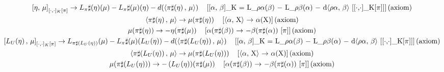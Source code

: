 \documentclass[11pt]{article}
\newcommand{\prompt}[4]{
        {\ttfamily\llap{{\color{#2}[#3]:\hspace{3pt}#4}}\vspace{-\baselineskip}}
    }
\begin{document}
            
\prompt{Out}{outcolor}{3}{}
    
    {\allowdisplaybreaks\scriptsize
\begin{gather*}
\left[\eta,\, \mu\right]_{[\cdot,\cdot]_K[\pi]} \to L_\pi\sharp(\eta)\!\left(\mu\right) - L_\pi\sharp(\mu)\!\left(\eta\right) - d\!\left(\langle \pi\sharp\!\left(\eta\right),\, \mu \rangle\right) \quad \text{[[\ensuremath{\alpha}, \ensuremath{\beta}]\_K = L\_\ensuremath{\rho}\ensuremath{\alpha}(\ensuremath{\beta}) \ensuremath{-} L\_\ensuremath{\rho}\ensuremath{\beta}(\ensuremath{\alpha}) \ensuremath{-} d\ensuremath{\langle}\ensuremath{\rho}\ensuremath{\alpha}, \ensuremath{\beta}\ensuremath{\rangle} [[\ensuremath{\cdot},\ensuremath{\cdot}]\_K[\ensuremath{\pi}]]]\,(axiom)} \\
\langle \pi\sharp\!\left(\eta\right),\, \mu \rangle \to \mu\!\left(\pi\sharp\!\left(\eta\right)\right) \quad \text{[\ensuremath{\langle}\ensuremath{\alpha}, X\ensuremath{\rangle} \ensuremath{\to} \ensuremath{\alpha}(X)]\,(axiom)} \\
\mu\!\left(\pi\sharp\!\left(\eta\right)\right) \to -\eta\!\left(\pi\sharp\!\left(\mu\right)\right) \quad \text{[\ensuremath{\alpha}(\ensuremath{\pi}\ensuremath{\sharp}(\ensuremath{\beta})) \ensuremath{\to} \ensuremath{-}\ensuremath{\beta}(\ensuremath{\pi}\ensuremath{\sharp}(\ensuremath{\alpha})) [\ensuremath{\pi}]]\,(axiom)} \\
\left[L_U\!\left(\eta\right),\, \mu\right]_{[\cdot,\cdot]_K[\pi]} \to L_{\pi\sharp(L_U(\eta))}\!\left(\mu\right) - L_\pi\sharp(\mu)\!\left(L_U\!\left(\eta\right)\right) - d\!\left(\langle \pi\sharp\!\left(L_U\!\left(\eta\right)\right),\, \mu \rangle\right) \quad \text{[[\ensuremath{\alpha}, \ensuremath{\beta}]\_K = L\_\ensuremath{\rho}\ensuremath{\alpha}(\ensuremath{\beta}) \ensuremath{-} L\_\ensuremath{\rho}\ensuremath{\beta}(\ensuremath{\alpha}) \ensuremath{-} d\ensuremath{\langle}\ensuremath{\rho}\ensuremath{\alpha}, \ensuremath{\beta}\ensuremath{\rangle} [[\ensuremath{\cdot},\ensuremath{\cdot}]\_K[\ensuremath{\pi}]]]\,(axiom)} \\
\langle \pi\sharp\!\left(L_U\!\left(\eta\right)\right),\, \mu \rangle \to \mu\!\left(\pi\sharp\!\left(L_U\!\left(\eta\right)\right)\right) \quad \text{[\ensuremath{\langle}\ensuremath{\alpha}, X\ensuremath{\rangle} \ensuremath{\to} \ensuremath{\alpha}(X)]\,(axiom)} \\
\mu\!\left(\pi\sharp\!\left(L_U\!\left(\eta\right)\right)\right) \to -\left(L_U\!\left(\eta\right)\right)\!\left(\pi\sharp\!\left(\mu\right)\right) \quad \text{[\ensuremath{\alpha}(\ensuremath{\pi}\ensuremath{\sharp}(\ensuremath{\beta})) \ensuremath{\to} \ensuremath{-}\ensuremath{\beta}(\ensuremath{\pi}\ensuremath{\sharp}(\ensuremath{\alpha})) [\ensuremath{\pi}]]\,(axiom)} \\

\end{gather*}}
\end{document}
